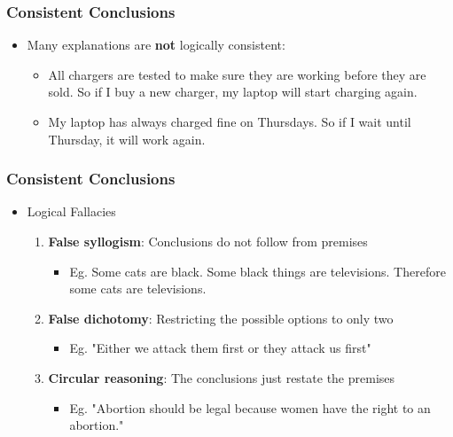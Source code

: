 \documentclass[xcolor=x11names,compress]{beamer}\usepackage[]{graphicx}\usepackage[]{color}
\renewcommand{\(}{\begin{columns}}
\renewcommand{\)}{\end{columns}}
\newcommand{\<}[1]{\begin{column}{#1}}
\renewcommand{\>}{\end{column}}
\begin{document}
\begin{frame}
\frametitle{Consistent Conclusions}
\begin{itemize}
\item Many explanations are \textbf{not} logically consistent:
\pause
\begin{itemize}
\item All chargers are tested to make sure they are working before they are sold. So if I buy a new charger, my laptop will start charging again.
\pause
\item My laptop has always charged fine on Thursdays. So if I wait until Thursday, it will work again. 
\end{itemize}
\end{itemize}
\end{frame}

\begin{frame}
\frametitle{Consistent Conclusions}
\begin{itemize}
\item Logical Fallacies
\pause
\begin{enumerate}
\item \textbf{False syllogism}: Conclusions do not follow from premises
\begin{itemize}
\item Eg. Some cats are black. Some black things are televisions. Therefore some cats are televisions.
\pause
\end{itemize}
\item \textbf{False dichotomy}: Restricting the possible options to only two
\begin{itemize}
\item Eg. "Either we attack them first or they attack us first"
\pause
\end{itemize}
\item \textbf{Circular reasoning}: The conclusions just restate the premises
\begin{itemize}
\item Eg. "Abortion should be legal because women have the right to an abortion."
\end{itemize}
\end{enumerate}
\end{itemize}
\end{frame}
\end{document}
